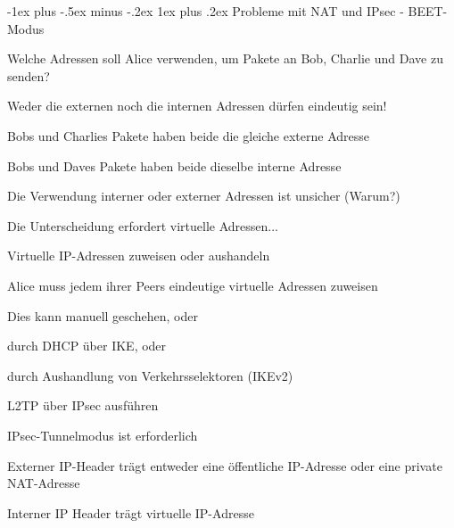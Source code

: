 \documentclass[a4paper]{article}
\makeatletter
\renewcommand{\subsubsection}{\@startsection{subsubsection}{3}{0mm}%
 {-1ex plus -.5ex minus -.2ex}%
 {1ex plus .2ex}%
 {\normalfont\small\bfseries}}
\makeatother
\begin{document}
\begin{multicols}{3}
\begin{itemize*}
            \subsubsection{Probleme mit NAT und IPsec -
                  BEET-Modus}
            \begin{itemize*}
                  \item       Welche Adressen soll Alice verwenden, um Pakete an Bob, Charlie und
                  Dave zu senden?
                  \item       Weder die externen noch die internen Adressen dürfen eindeutig sein!
                  \begin{itemize*}
                        \item Bobs und Charlies Pakete haben beide die gleiche externe Adresse
                        \item Bobs und Daves Pakete haben beide dieselbe interne Adresse
                        \item Die Verwendung interner oder externer Adressen ist unsicher (Warum?)
                        \item Die Unterscheidung erfordert virtuelle Adressen...
                  \end{itemize*}
                  \item       Virtuelle IP-Adressen zuweisen oder aushandeln
                  \begin{itemize*}
                        \item Alice muss jedem ihrer Peers eindeutige virtuelle Adressen zuweisen
                        \item Dies kann manuell geschehen, oder
                        \item durch DHCP über IKE, oder
                        \item durch Aushandlung von Verkehrsselektoren (IKEv2)
                        \item L2TP über IPsec ausführen
                  \end{itemize*}
                  \item       IPsec-Tunnelmodus ist erforderlich
                  \begin{itemize*}
                        \item Externer IP-Header trägt entweder eine öffentliche IP-Adresse oder eine private NAT-Adresse
                        \item Interner IP Header trägt virtuelle IP-Adresse

\end{itemize*}
\end{itemize*}
\end{itemize*}
\end{multicols}
\end{document}
